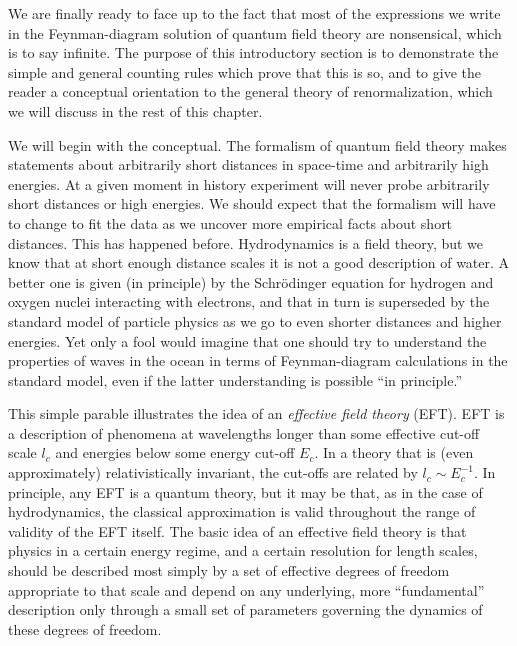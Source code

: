 
We are finally ready to face up to the fact that most of the expressions we
write in the Feynman-diagram solution of quantum field theory are nonsensical,
which is to say infinite. The purpose of this introductory section is to
demonstrate the simple and general counting rules which prove that this is so,
and to give the reader a conceptual orientation to the general theory of
renormalization, which we will discuss in the rest of this chapter.

We will begin with the conceptual. The formalism of quantum field theory makes
statements about arbitrarily short distances in space-time and arbitrarily high
energies. At a given moment in history experiment will never probe arbitrarily
short distances or high energies. We should expect that the formalism will have
to change to fit the data as we uncover more empirical facts about short
distances. This has happened before. Hydrodynamics is a field theory, but we
know that at short enough distance scales it is not a good description of
water. A better one is given (in principle) by the Schrödinger equation for
hydrogen and oxygen nuclei interacting with electrons, and that in turn is
superseded by the standard model of particle physics as we go to even shorter
distances and higher energies. Yet only a fool would imagine that one should
try to understand the properties of waves in the ocean in terms of
Feynman-diagram calculations in the standard model, even if the latter
understanding is possible ``in principle.''

This simple parable illustrates the idea of an \emph{effective field theory}
(EFT). EFT is a description of phenomena at wavelengths longer than some
effective cut-off scale $l_c$ and energies below some energy cut-off $E_c$. In
a theory that is (even approximately) relativistically invariant, the cut-offs
are related by $l_c\sim E_c^{-1}$. In principle, any EFT is a quantum theory,
but it may be that, as in the case of hydrodynamics, the classical
approximation is valid throughout the range of validity of the EFT itself.
The basic idea of an effective field theory is that physics in a certain
energy regime, and a certain resolution for length scales, should be described
most simply by a set of effective degrees of freedom appropriate to that scale
and depend on any underlying, more ``fundamental'' description only through a
small set of parameters governing the dynamics of these degrees of freedom.

